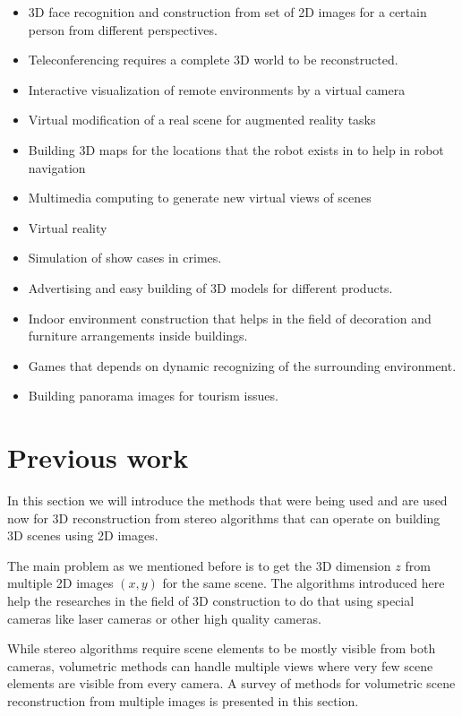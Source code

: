 \begin{itemize}
	\item 3D face recognition and construction from set of  2D images for a certain person from different perspectives.
	\item Teleconferencing requires a complete 3D world to be reconstructed.
	\item Interactive visualization of remote environments by a virtual camera 
	\item Virtual modification of a real scene for augmented reality tasks
	\item Building 3D maps for the locations that the robot exists in to help in robot navigation
	\item Multimedia computing to generate new virtual views of scenes
	\item Virtual reality
	\item Simulation of show cases in crimes.
	\item Advertising and easy building of 3D models for different products.
	\item Indoor environment construction that helps in the field of decoration and furniture arrangements inside buildings.
	\item Games that depends on dynamic recognizing of the surrounding environment.
	\item Building panorama images for tourism issues. 
\end{itemize}


\section{Previous work}

In this section we will introduce the methods that were being used and are used now for 3D reconstruction from stereo algorithms that can operate on building 3D scenes using 2D images.

The main problem as we mentioned before is to get the 3D dimension $z$ from multiple 2D images $(x,y)$ for the same scene. The algorithms introduced here help the researches in the field of 3D construction to do that using special cameras like laser cameras or other high quality cameras.

While stereo algorithms require scene elements to be mostly visible from both cameras, volumetric methods can handle multiple views where very few scene elements are visible from every camera. A survey of methods for volumetric scene reconstruction from multiple images is presented in this section.

